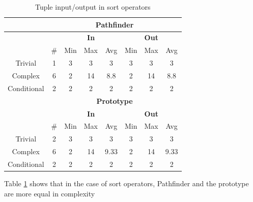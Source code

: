 \begin{table}[!htp]
 \begin{center}
 \begin{tabular}{| c | c | c | c | c | c | c | c |}
  \hline
   & \multicolumn{7}{|c|}{\textbf{Pathfinder}} \\
   \hline
   &  & \multicolumn{3}{|c|}{\textbf{In}} &
   \multicolumn{3}{|c|}{\textbf{Out}}  \\
   \hline
   &  \# & Min & Max & Avg & Min & Max & Avg\\
   \hline
   Trivial & 1 & 3 & 3 & 3 & 3 & 3 & 3  \\
   \hline
   Complex & 6 & 2 & 14 & 8.8 & 2 & 14 & 8.8  \\
   \hline
   Conditional & 2 & 2 & 2 & 2 & 2 & 2 & 2  \\
   \hline
   & \multicolumn{7}{|c|}{\textbf{Prototype}} \\
   \hline
   &  & \multicolumn{3}{|c|}{\textbf{In}} &
   \multicolumn{3}{|c|}{\textbf{Out}} \\
   \hline
   & \# & Min & Max & Avg & Min & Max & Avg \\
   \hline
   Trivial & 2 & 3 & 3 & 3 & 3 & 3 & 3 \\
   \hline
   Complex & 6 & 2 & 14 & 9.33 & 2 & 14 & 9.33 \\
   \hline
   Conditional & 2 & 2 & 2 & 2 & 2 & 2 & 2 \\
   \hline
 \end{tabular}
\caption{Tuple input/output in sort operators}
\label{table:result:complexity_matrix_tio_2}
 \end{center}
\end{table}

Table \ref{table:result:complexity_matrix_tio_2} shows that in the
case of sort operators, Pathfinder and the prototype are more equal in
complexity

